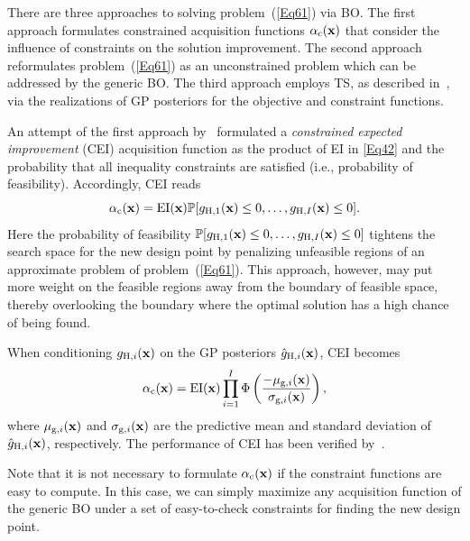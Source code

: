 \documentclass[iicol,sn-basic]{sn-jnl}%
\begin{document}
There are three approaches to solving problem~(\ref{Eq61}) via BO.
The first approach formulates constrained acquisition functions $\alpha_\text{c}({\bf x})$ that consider the influence of constraints on the solution improvement.
The second approach reformulates problem~(\ref{Eq61}) as an unconstrained problem which can be addressed by the generic BO.
The third approach employs TS, as described in~, via the realizations of GP posteriors for the objective and constraint functions.    

An attempt of the first approach by~\cite{Schonlau1998} formulated a \textit{constrained expected improvement} (CEI) acquisition function as the product of EI in \cref{Eq42} and the probability that all inequality constraints are satisfied (i.e., probability of feasibility).
Accordingly, CEI reads
\begin{equation}\label{Eq62}
	\alpha_\text{c}({\bf x}) = \text{EI}({\bf x}) \mathbb{P}[g_{\text{H},1}({\bf x}) \leq 0,\dots,g_{\text{H},I}({\bf x}) \leq 0].
\end{equation}
Here the probability of feasibility $\mathbb{P}[g_{\text{H},1}({\bf x}) \leq 0,\dots,g_{\text{H},I}({\bf x}) \leq 0]$ tightens the search space for the new design point by penalizing unfeasible regions of an approximate problem of problem~(\ref{Eq61}).
This approach, however, may put more weight on the feasible regions away from the boundary of feasible space, thereby overlooking the boundary where the optimal solution has a high chance of being found.

When conditioning $g_{\text{H},i}({\bf x})$ on the GP posteriors $\hat{g}_{\text{H},i}({\bf x})$, CEI becomes
\begin{equation}\label{Eq63}
	\alpha_\text{c}({\bf x}) = \text{EI}({\bf x}) \prod_{i=1}^I\Phi\left(\frac{-\mu_{\text{g},i}({\bf x})}{\sigma_{\text{g},i}({\bf x})}\right),
\end{equation}
where $\mu_{\text{g},i}({\bf x})$ and $\sigma_{\text{g},i}({\bf x})$ are the predictive mean and standard deviation of $\hat{g}_{\text{H},i}({\bf x})$, respectively.
The performance of CEI has been verified by~\cite{Gardner2014,Sobester2014,Kontogiannis2020b}.

Note that it is not necessary to formulate $\alpha_\text{c}({\bf x})$ if the constraint functions are easy to compute.
In this case, we can simply maximize any acquisition function of the generic BO under a set of easy-to-check constraints for finding the new design point.
\end{document}
